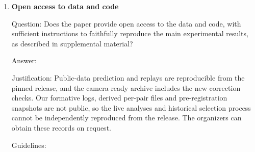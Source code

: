 \documentclass[
]{article}
\begin{document}
\begin{enumerate}
\begin{itemize}
    \begin{enumerate}
    \def\labelenumii{(\alph{enumii})}
    \item
      If the contribution is primarily a new algorithm, the paper should
      make it clear how to reproduce that algorithm.
    \item
      If the contribution is primarily a new model architecture, the
      paper should describe the architecture clearly and fully.
    \item
      If the contribution is a new model (e.g., a large language model),
      then there should either be a way to access this model for
      reproducing the results or a way to reproduce the model (e.g.,
      with an open-source dataset or instructions for how to construct
      the dataset).
    \item
      We recognize that reproducibility may be tricky in some cases, in
      which case authors are welcome to describe the particular way they
      provide for reproducibility. In the case of closed-source models,
      it may be that access to the model is limited in some way (e.g.,
      to registered users), but it should be possible for other
      researchers to have some path to reproducing or verifying the
      results.
    \end{enumerate}
  \end{itemize}
\item
  \textbf{Open access to data and code}

  Question: Does the paper provide open access to the data and code,
  with sufficient instructions to faithfully reproduce the main
  experimental results, as described in supplemental material?

  Answer: \answerNo{}

  Justification: Public-data prediction and replays are reproducible
  from the pinned release, and the camera-ready archive includes the new
  correction checks. Our formative logs, derived per-pair files and
  pre-registration snapshots are not public, so the live analyses and
  historical selection process cannot be independently reproduced from
  the release. The organizers can obtain these records on request.

  Guidelines:


\end{enumerate}
\end{document}
